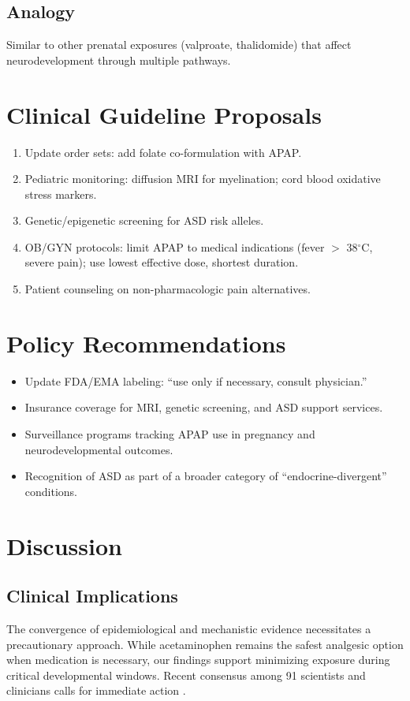 \documentclass[12pt]{article}
\begin{document}
\subsection{Analogy}
Similar to other prenatal exposures (valproate, thalidomide) that affect neurodevelopment through multiple pathways.

\section{Clinical Guideline Proposals}
\begin{enumerate}
    \item Update order sets: add folate co-formulation with APAP.
    \item Pediatric monitoring: diffusion MRI for myelination; cord blood oxidative stress markers.
    \item Genetic/epigenetic screening for ASD risk alleles.
    \item OB/GYN protocols: limit APAP to medical indications (fever $>$ 38$^\circ$C, severe pain); use lowest effective dose, shortest duration.
    \item Patient counseling on non-pharmacologic pain alternatives.
\end{enumerate}

\section{Policy Recommendations}
\begin{itemize}
    \item Update FDA/EMA labeling: ``use only if necessary, consult physician.''
    \item Insurance coverage for MRI, genetic screening, and ASD support services.
    \item Surveillance programs tracking APAP use in pregnancy and neurodevelopmental outcomes.
    \item Recognition of ASD as part of a broader category of ``endocrine-divergent'' conditions.
\end{itemize}

\section{Discussion}

\subsection{Clinical Implications}
The convergence of epidemiological and mechanistic evidence \citep{navarro2025,bauer2021} necessitates a precautionary approach. While acetaminophen remains the safest analgesic option when medication is necessary, our findings support minimizing exposure during critical developmental windows. Recent consensus among 91 scientists and clinicians calls for immediate action \citep{bauer2021}.
\end{document}
